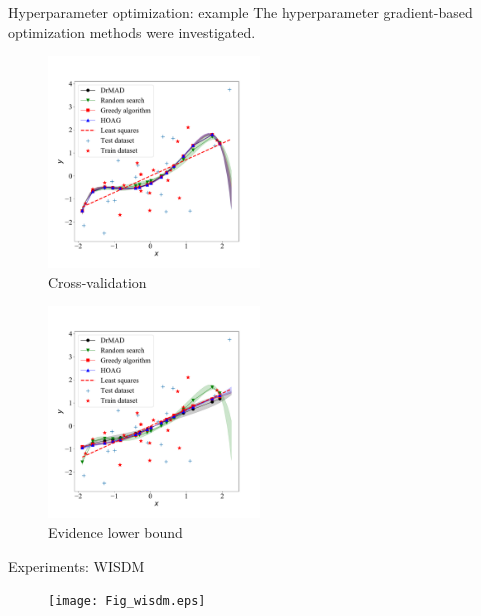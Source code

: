 \documentclass[usenames,dvipsnames,11pt,pdf,utf8,russian,aspectratio=43]{beamer}
\begin{document}
\begin{frame}{Hyperparameter optimization: example}
The hyperparameter gradient-based optimization methods were investigated.\\

\begin{multicols}{2}

\begin{figure}[h]
\hspace*{-1cm}
\includegraphics[width=0.5\textwidth]{./slide_plots/Fig_poly_cv2.pdf}
\caption*{Cross-validation}
\end{figure}

\begin{figure}[h]
\hspace*{-1cm}
\includegraphics[width=0.5\textwidth]{./slide_plots/Fig_poly_var2.pdf}
\caption*{Evidence lower bound}
\end{figure}
\end{multicols}

\end{frame}



\begin{frame}{Experiments: WISDM}
\begin{figure}  
\texttt{[image: Fig\_wisdm.eps]}
\end{figure}
\end{frame}
\end{document}
